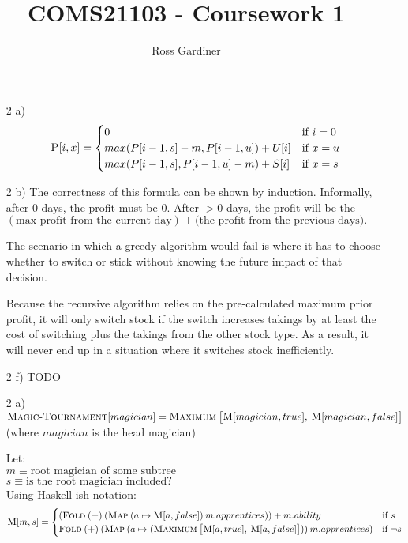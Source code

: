 \documentclass[]{article}
\title{COMS21103 - Coursework 1}
\author{Ross Gardiner}
\begin{document}
\maketitle

\begin{itemize}
	\item [2 a)] 
		$$
			\textsc{P}[i, x] =
			\begin{cases}
				0 & \text{if } i = 0 \\
				max(P[i-1, s] - m, P[i-1, u]) + U[i] & \text{if } x = u \\
				max(P[i-1, s], P[i-1, u] - m) + S[i] & \text{if } x = s \\
			\end{cases}
		$$
	
	\item [2 b)] 
		The correctness of this formula can be shown by induction. Informally, after 0 days, the profit must be 0. After $>0$ days, the profit will be the $(\text{max profit from the current day}) + \text{(the profit from the previous days)}.$
	
		The scenario in which a greedy algorithm would fail is where it has to choose whether to switch or stick without knowing the future impact of that decision. 
	
		Because the recursive algorithm relies on the pre-calculated maximum prior profit, it will only switch stock if the switch increases takings by at least the cost of switching plus the takings from the other stock type. As a result, it will never end up in a situation where it switches stock inefficiently.
		
	\item [2 f)]
		TODO
		
	\item [2 a)]
		$\textsc{Magic-Tournament}[magician] = 
			\textsc{Maximum} \: 
				\big[ \textsc{M}[magician, true], \: \textsc{M}[magician, false] \big] $ \\
		(where $magician$ is the head magician)
				
		Let: \\ 
			$m \equiv \text{root magician of some subtree}$ \\
			$s \equiv \text{is the root magician included?}$ \\
		
		Using Haskell-ish notation:
		$$
			\textsc{M}[m, s] =
			\begin{cases}
				(\textsc{Fold} \: 
					(+) \: 
					(\textsc{Map} \: 
						(a \mapsto \textsc{M}[a, false]) \:
						m.apprentices)) + m.ability
				& \text{if } s \\
				\textsc{Fold} \:
					(+) \:
					(\textsc{Map} \: 
						(a \mapsto 
							(\textsc{Maximum} \: \big[ \textsc{M}[a, true], \: \textsc{M}[a, false] \big] )) \:
						m.apprentices) 
				& \text{if } \neg s \\
			\end{cases}
		$$
		

\end{itemize}
\end{document}
